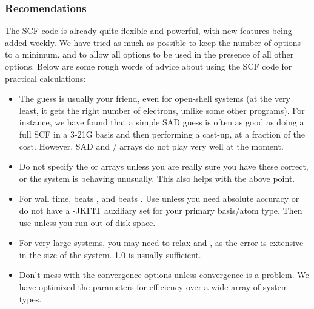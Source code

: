 \subsubsection{Recomendations}

The SCF code is already quite flexible and powerful, with new features being
added weekly. We have tried as much as possible to keep the number of options
to a minimum, and to allow all options to be used in the presence of all other
options. Below are some rough words of advice about using the SCF code for
practical calculations:
\begin{itemize}
\item The  guess is usually your friend, even for open-shell systems (at the
very least, it gets the right number of electrons, unlike some other programs).
For instance, we have found that a simple SAD guess is often as good as doing a
full SCF in a 3-21G basis and then performing a cast-up, at a fraction of the
cost.  However, SAD and / arrays do not play very well
at the moment. 
\item Do not specify the  or  arrays unless you are
really sure you have these correct, or the system is behaving unusually. 
This also helps with the above point.
\item For wall time,  beats , and 
 beats
. Use  unless you need absolute accuracy or do not
have a -JKFIT auxiliary set for your primary basis/atom type. Then use
 unless you run out of disk space.
\item For very large systems, you may need to relax  and
, as the error is extensive in the size of the system.
1.0 is usually sufficient.  
\item Don't mess with the convergence options unless convergence is a problem.
We have optimized the parameters for efficiency over a wide array of system
types.  
\end{itemize} 

